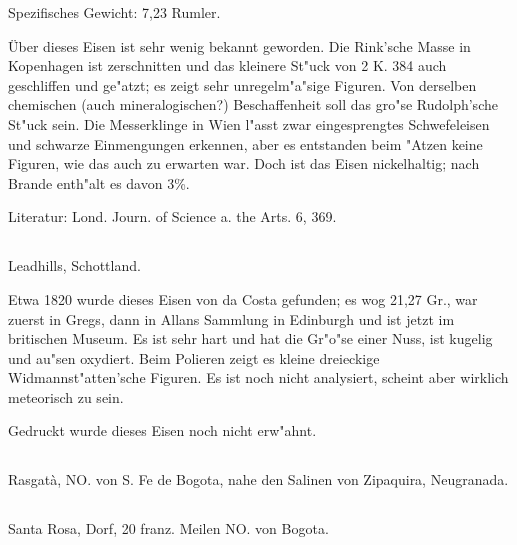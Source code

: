 \documentclass[a4paper, 11pt, oneside]{article}
\begin{document}
Spezifisches Gewicht: 7,23 Rumler.

Über dieses Eisen ist sehr wenig bekannt geworden. Die Rink'sche Masse in Kopenhagen ist zerschnitten und das kleinere St"uck von 2 K. 384 auch geschliffen und ge"atzt; es zeigt sehr unregelm"a"sige Figuren. Von derselben chemischen (auch mineralogischen?) Beschaffenheit soll das gro"se Rudolph'sche St"uck sein. Die Messerklinge in Wien l"asst zwar eingesprengtes Schwefeleisen und schwarze Einmengungen erkennen, aber es entstanden beim "Atzen keine Figuren, wie das auch zu erwarten war. Doch ist das Eisen nickelhaltig; nach Brande enth"alt es davon 3\%.

\normalsize
Literatur: Lond. Journ. of Science a. the Arts. 6, 369.

\subsection{}
\LARGE
\paragraph{}
Leadhills, Schottland.

Etwa 1820 wurde dieses Eisen von da Costa gefunden; es wog 21,27 Gr., war zuerst in Gregs, dann in Allans Sammlung in Edinburgh und ist jetzt im britischen Museum. Es ist sehr hart und hat die Gr"o"se einer Nuss, ist kugelig und au"sen oxydiert. Beim Polieren zeigt es kleine dreieckige Widmannst"atten'sche Figuren. Es ist noch nicht analysiert, scheint aber wirklich meteorisch zu sein.

Gedruckt wurde dieses Eisen noch nicht erw"ahnt.
\subsection{}
\paragraph{}
Rasgatà, NO. von S. Fe de Bogota, nahe den Salinen von Zipaquira, Neugranada.

\subsection{}
\paragraph{}
Santa Rosa, Dorf, 20 franz. Meilen NO. von Bogota.
\end{document}
